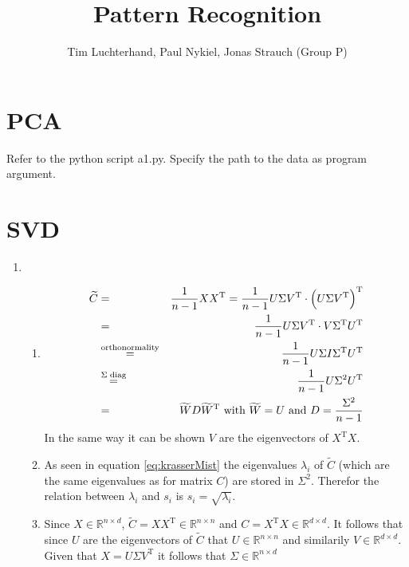 \documentclass[DIN, pagenumber=false, fontsize=11pt, parskip=half]{scrartcl}
\title{Pattern Recognition}
\author{Tim Luchterhand, Paul Nykiel, Jonas Strauch (Group P)}
\newcommand{\R}[0]{\mathbb{R}}
\begin{document}
    \maketitle
    \section{PCA}
    Refer to the python script a1.py. Specify the path to the data as program argument.
    \section{SVD}
    \begin{enumerate}
        \item
        \begin{enumerate}
            \item
            \begin{eqnarray}
                \widetilde{C} &=& \frac{1}{n-1} X X^\text{T} = \frac{1}{n-1} U \Sigma V^\text{T} \cdot \left(U \Sigma V^\text{T} \right)^\text{T} \\
                &=& \frac{1}{n-1} U \Sigma V^\text{T} \cdot V \Sigma^\text{T} U^\text{T} \\
                &\stackrel{\tiny\text{orthonormality}}{=}& \frac{1}{n-1} U \Sigma I \Sigma^\text{T} U^\text{T}  \\
                \label{eq:krasserMist}
                &\stackrel{\tiny\Sigma \ \text{diag}}{=}& \frac{1}{n-1} U \Sigma^2 U^\text{T} \\
                &=& \widetilde{W} D \widetilde{W}^\text{T} \ \text{with} \ \widetilde{W} = U \ \text{and} \ D = \frac{\Sigma^2}{n-1}
            \end{eqnarray}
            In the same way it can be shown $V$ are the eigenvectors of $X^\text{T} X$.

            \item
            As seen in equation \ref{eq:krasserMist} the eigenvalues $\lambda_i$ of $\widetilde{C}$ (which are the same eigenvalues as for matrix $C$) are
            stored in $\Sigma^2$. Therefor the relation between $\lambda_i$ and $s_i$ is $s_i = \sqrt{\lambda_i}$.

            \item
            Since $X \in \R^{n \times d}$, $\widetilde{C} = X X^\text{T} \in \R^{n \times n}$ and $C = X^\text{T} X \in \R^{d \times d}$. It follows that
            since $U$ are the eigenvectors of $\widetilde{C}$ that $U \in \R^{n \times n}$ and similarily $V \in \R^{d \times d}$.
            Given that $X = U \Sigma V^\text{T}$ it follows that $\Sigma \in \R^{n \times d}$


\end{enumerate}
\end{enumerate}
\end{document}
